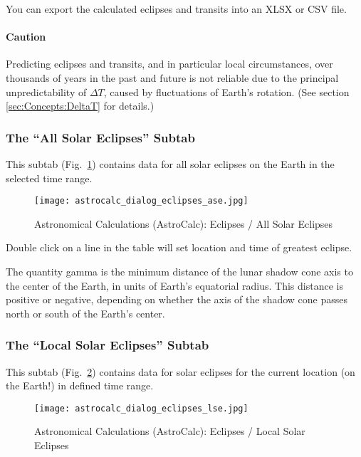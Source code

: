 You can export the calculated eclipses and transits into an XLSX or CSV file.

\paragraph{Caution}
Predicting eclipses and transits, and in particular local circumstances, over thousands of years in the past and future
is not reliable due to the principal unpredictability of $\Delta T$, caused by fluctuations of Earth's rotation. (See section \ref{sec:Concepts:DeltaT} for details.)


\subsubsection{The ``All Solar Eclipses'' Subtab}
\label{sec:gui:AstroCalc:Eclipses:AllSolarEclipses}

This subtab (Fig.~\ref{fig:gui:AstroCalc:Eclipses:AllSolarEclipses}) contains data for all solar eclipses on the Earth in the selected time range. 

\begin{figure}[htbp]
\centering\texttt{[image: astrocalc\_dialog\_eclipses\_ase.jpg]}
\caption{Astronomical Calculations (AstroCalc): Eclipses / All Solar Eclipses}
\label{fig:gui:AstroCalc:Eclipses:AllSolarEclipses}
\end{figure}

Double click on a line in the table will set location and time of greatest eclipse.

The quantity gamma is the minimum distance of the lunar shadow cone axis to the center of the Earth, in units of Earth’s equatorial radius.
This distance is positive or negative, depending on whether the axis of the shadow cone passes north or south of the Earth's center.

\subsubsection{The ``Local Solar Eclipses'' Subtab}
\label{sec:gui:AstroCalc:Eclipses:LocalSolarEclipses}

This subtab (Fig.~\ref{fig:gui:AstroCalc:Eclipses:LocalSolarEclipses}) contains data for solar eclipses for the current location (on the Earth!) in defined time range. 

\begin{figure}[tbp]
\centering\texttt{[image: astrocalc\_dialog\_eclipses\_lse.jpg]}
\caption{Astronomical Calculations (AstroCalc): Eclipses / Local Solar Eclipses}
\label{fig:gui:AstroCalc:Eclipses:LocalSolarEclipses}
\end{figure}

